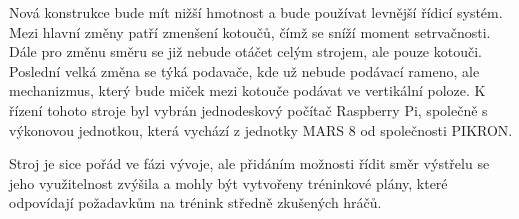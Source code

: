 Nová konstrukce bude mít nižší hmotnost a bude používat levnější řídicí systém. Mezi hlavní změny patří zmenšení kotoučů, čímž se sníží moment setrvačnosti. Dále pro změnu směru se již nebude otáčet celým strojem, ale pouze kotouči. Poslední velká změna se týká podavače, kde už nebude podávací rameno, ale mechanizmus, který bude miček mezi kotouče podávat ve vertikální poloze. K řízení tohoto stroje byl vybrán jednodeskový počítač Raspberry Pi, společně s výkonovou jednotkou, která vychází z jednotky MARS 8 od společnosti PIKRON.

Stroj je sice pořád ve fázi vývoje, ale přidáním možnosti řídit směr výstřelu se jeho využitelnost zvýšila a mohly být vytvořeny tréninkové plány, které odpovídají požadavkům na trénink středně zkušených hráčů.




